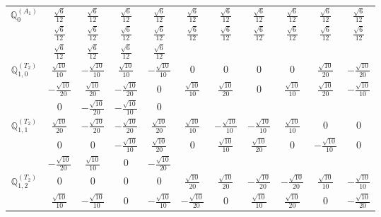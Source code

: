 \documentclass[fleqn,10pt,landscape]{article}
\begin{document}
\begin{itemize}
{\begin{center}
\begin{longtable}{ccccccccccc}
$\mathbb{Q}_{0}^{(A_{1})}$ & $ \frac{\sqrt{6}}{12} $ & $ \frac{\sqrt{6}}{12} $ & $ \frac{\sqrt{6}}{12} $ & $ \frac{\sqrt{6}}{12} $ & $ \frac{\sqrt{6}}{12} $ & $ \frac{\sqrt{6}}{12} $ & $ \frac{\sqrt{6}}{12} $ & $ \frac{\sqrt{6}}{12} $ & $ \frac{\sqrt{6}}{12} $ & $ \frac{\sqrt{6}}{12} $ \\
& $ \frac{\sqrt{6}}{12} $ & $ \frac{\sqrt{6}}{12} $ & $ \frac{\sqrt{6}}{12} $ & $ \frac{\sqrt{6}}{12} $ & $ \frac{\sqrt{6}}{12} $ & $ \frac{\sqrt{6}}{12} $ & $ \frac{\sqrt{6}}{12} $ & $ \frac{\sqrt{6}}{12} $ & $ \frac{\sqrt{6}}{12} $ & $ \frac{\sqrt{6}}{12} $ \\
& $ \frac{\sqrt{6}}{12} $ & $ \frac{\sqrt{6}}{12} $ & $ \frac{\sqrt{6}}{12} $ & $ \frac{\sqrt{6}}{12} $ & $  $ & $  $ & $  $ & $  $ & $  $ & $  $ \\ \hline
$\mathbb{Q}_{1,0}^{(T_{2})}$ & $ \frac{\sqrt{10}}{10} $ & $ - \frac{\sqrt{10}}{10} $ & $ \frac{\sqrt{10}}{10} $ & $ - \frac{\sqrt{10}}{10} $ & $ 0 $ & $ 0 $ & $ 0 $ & $ 0 $ & $ \frac{\sqrt{10}}{20} $ & $ - \frac{\sqrt{10}}{20} $ \\
& $ - \frac{\sqrt{10}}{20} $ & $ \frac{\sqrt{10}}{20} $ & $ - \frac{\sqrt{10}}{20} $ & $ 0 $ & $ \frac{\sqrt{10}}{10} $ & $ \frac{\sqrt{10}}{20} $ & $ 0 $ & $ \frac{\sqrt{10}}{10} $ & $ \frac{\sqrt{10}}{20} $ & $ - \frac{\sqrt{10}}{10} $ \\
& $ 0 $ & $ - \frac{\sqrt{10}}{20} $ & $ - \frac{\sqrt{10}}{10} $ & $ 0 $ & $  $ & $  $ & $  $ & $  $ & $  $ & $  $ \\ \hline
$\mathbb{Q}_{1,1}^{(T_{2})}$ & $ \frac{\sqrt{10}}{20} $ & $ - \frac{\sqrt{10}}{20} $ & $ - \frac{\sqrt{10}}{20} $ & $ \frac{\sqrt{10}}{20} $ & $ \frac{\sqrt{10}}{10} $ & $ - \frac{\sqrt{10}}{10} $ & $ - \frac{\sqrt{10}}{10} $ & $ \frac{\sqrt{10}}{10} $ & $ 0 $ & $ 0 $ \\
& $ 0 $ & $ 0 $ & $ - \frac{\sqrt{10}}{10} $ & $ \frac{\sqrt{10}}{20} $ & $ 0 $ & $ \frac{\sqrt{10}}{10} $ & $ \frac{\sqrt{10}}{20} $ & $ 0 $ & $ - \frac{\sqrt{10}}{10} $ & $ 0 $ \\
& $ - \frac{\sqrt{10}}{20} $ & $ \frac{\sqrt{10}}{10} $ & $ 0 $ & $ - \frac{\sqrt{10}}{20} $ & $  $ & $  $ & $  $ & $  $ & $  $ & $  $ \\ \hline
$\mathbb{Q}_{1,2}^{(T_{2})}$ & $ 0 $ & $ 0 $ & $ 0 $ & $ 0 $ & $ \frac{\sqrt{10}}{20} $ & $ \frac{\sqrt{10}}{20} $ & $ - \frac{\sqrt{10}}{20} $ & $ - \frac{\sqrt{10}}{20} $ & $ \frac{\sqrt{10}}{10} $ & $ - \frac{\sqrt{10}}{10} $ \\
& $ \frac{\sqrt{10}}{10} $ & $ - \frac{\sqrt{10}}{10} $ & $ 0 $ & $ - \frac{\sqrt{10}}{10} $ & $ - \frac{\sqrt{10}}{20} $ & $ 0 $ & $ \frac{\sqrt{10}}{10} $ & $ \frac{\sqrt{10}}{20} $ & $ 0 $ & $ - \frac{\sqrt{10}}{20} $ \\

\end{longtable}
\end{center}}
\end{itemize}
\end{document}
